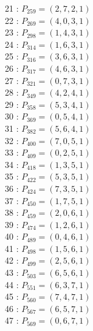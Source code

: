 \documentclass{article}
\begin{document}
{\begin{multicols}{2}
21 : $P_{259}=( 2, 7, 2, 1 )$\\
22 : $P_{269}=( 4, 0, 3, 1 )$\\
23 : $P_{298}=( 1, 4, 3, 1 )$\\
24 : $P_{314}=( 1, 6, 3, 1 )$\\
25 : $P_{316}=( 3, 6, 3, 1 )$\\
26 : $P_{317}=( 4, 6, 3, 1 )$\\
27 : $P_{321}=( 0, 7, 3, 1 )$\\
28 : $P_{349}=( 4, 2, 4, 1 )$\\
29 : $P_{358}=( 5, 3, 4, 1 )$\\
30 : $P_{369}=( 0, 5, 4, 1 )$\\
31 : $P_{382}=( 5, 6, 4, 1 )$\\
32 : $P_{400}=( 7, 0, 5, 1 )$\\
33 : $P_{409}=( 0, 2, 5, 1 )$\\
34 : $P_{418}=( 1, 3, 5, 1 )$\\
35 : $P_{422}=( 5, 3, 5, 1 )$\\
36 : $P_{424}=( 7, 3, 5, 1 )$\\
37 : $P_{450}=( 1, 7, 5, 1 )$\\
38 : $P_{459}=( 2, 0, 6, 1 )$\\
39 : $P_{474}=( 1, 2, 6, 1 )$\\
40 : $P_{489}=( 0, 4, 6, 1 )$\\
41 : $P_{498}=( 1, 5, 6, 1 )$\\
42 : $P_{499}=( 2, 5, 6, 1 )$\\
43 : $P_{503}=( 6, 5, 6, 1 )$\\
44 : $P_{551}=( 6, 3, 7, 1 )$\\
45 : $P_{560}=( 7, 4, 7, 1 )$\\
46 : $P_{567}=( 6, 5, 7, 1 )$\\
47 : $P_{569}=( 0, 6, 7, 1 )$\\
\end{multicols}
}
\end{document}
